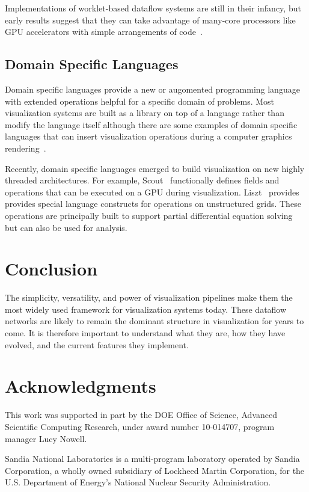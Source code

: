 \documentclass[journal,onecolumn,12pt,letterpaper,twoside]{IEEEtran}
\newcommand*{\lcite}[1]{~\cite{#1}}
\begin{document}
Implementations of worklet-based dataflow systems are still in their
infancy, but early results suggest that they can take advantage of
many-core processors like GPU accelerators with simple arrangements of
code\lcite{Moreland2011:LDAV}.

\subsection{Domain Specific Languages}

Domain specific languages provide a new or augomented programming language
with extended operations helpful for a specific domain of problems.  Most
visualization systems are built as a library on top of a language rather
than modify the language itself although there are some examples of domain
specific languages that can insert visualization operations during a
computer graphics rendering\lcite{Corrie1993,Crawfis1991}.

Recently, domain specific languages emerged to build visualization on new
highly threaded architectures.  For example, Scout\lcite{Scout}
functionally defines fields and operations that can be executed on a GPU
during visualization.  Liszt\lcite{Liszt} provides provides special
language constructs for operations on unstructured grids.  These operations
are principally built to support partial differential equation solving but
can also be used for analysis.


\section{Conclusion}
\label{sec:Conclusion}

The simplicity, versatility, and power of visualization pipelines make them
the most widely used framework for visualization systems today.  These
dataflow networks are likely to remain the dominant structure in
visualization for years to come.  It is therefore important to understand
what they are, how they have evolved, and the current features they
implement.


\section*{Acknowledgments}

This work was supported in part by the DOE Office of Science, Advanced
Scientific Computing Research, under award number 10-014707, program
manager Lucy Nowell.

Sandia National Laboratories is a multi-program laboratory operated by
Sandia Corporation, a wholly owned subsidiary of Lockheed Martin
Corporation, for the U.S. Department of Energy's National Nuclear Security
Administration.
\end{document}
